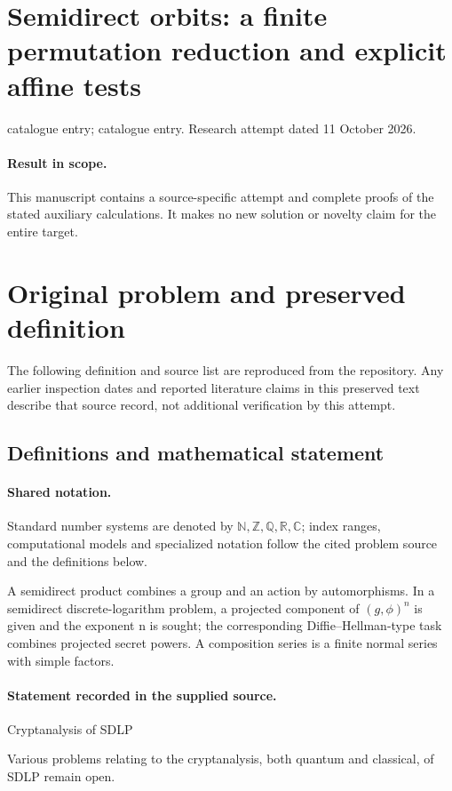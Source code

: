 \documentclass[11pt]{article}
\begin{document}
\section*{Semidirect orbits: a finite permutation reduction and explicit affine tests}
\noindent catalogue entry; catalogue entry. Research attempt dated 11 October 2026.
\paragraph{Result in scope.}This manuscript contains a source-specific attempt and complete proofs of the stated auxiliary calculations. It makes no new solution or novelty claim for the entire target.
\section{Original problem and preserved definition}
The following definition and source list are reproduced from the repository. Any earlier inspection dates and reported literature claims in this preserved text describe that source record, not additional verification by this attempt.
\subsection{Definitions and mathematical statement}

\paragraph{Shared notation.}Standard number systems are denoted by $\mathbb N,\mathbb Z,\mathbb Q,\mathbb R,\mathbb C$; index ranges, computational models and specialized notation follow the cited problem source and the definitions below.


A semidirect product combines a group and an action by automorphisms. In a semidirect discrete-logarithm problem, a projected component of $(g,\phi)^n$ is given and the exponent n is sought; the corresponding Diffie--Hellman-type task combines projected secret powers. A composition series is a finite normal series with simple factors.
\paragraph{Statement recorded in the supplied source.}
Cryptanalysis of SDLP

Various problems relating to the cryptanalysis, both quantum and classical, of SDLP remain open.
\end{document}
